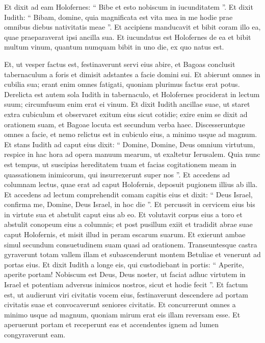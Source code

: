 \begin{biblechapter}
\begin{biblechapter}
\begin{biblechapter}
\begin{biblechapter}
\begin{biblechapter}
\begin{biblechapter}
\begin{biblechapter}
\begin{biblechapter}
\begin{biblechapter}
\begin{biblechapter}
\begin{biblechapter}
\begin{biblechapter}
\verse Et dixit ad eam Holofernes: “ Bibe et esto nobiscum in iucunditatem ”. 
\verse Et dixit Iudith: “ Bibam, domine, quia magnificata est vita mea in me hodie prae omnibus diebus nativitatis meae ”. 
\verse Et accipiens manducavit et bibit coram illo ea, quae praeparaverat ipsi ancilla sua. 
\verse Et iucundatus est Holofernes de ea et bibit multum vinum, quantum numquam bibit in uno die, ex quo natus est.
 
\begin{biblechapter}
\verse Et, ut vesper factus est, festinaverunt servi eius abire, et Bagoas conclusit tabernaculum a foris et dimisit adstantes a facie domini sui. Et abierunt omnes in cubilia sua; erant enim omnes fatigati, quoniam plurimus factus erat potus. 
\verse Derelicta est autem sola Iudith in tabernaculo, et Holofernes prociderat in lectum suum; circumfusum enim erat ei vinum. 
\verse Et dixit Iudith ancillae suae, ut staret extra cubiculum et observaret exitum eius sicut cotidie; exire enim se dixit ad orationem suam, et Bagoae locuta est secundum verba haec.
 \verse Discesseruntque omnes a facie, et nemo relictus est in cubiculo eius, a minimo usque ad magnum. Et stans Iudith ad caput eius dixit: “ Domine, Domine, Deus omnium virtutum, respice in hac hora ad opera manuum mearum, ut exaltetur Ierusalem. 
\verse Quia nunc est tempus, ut suscipias hereditatem tuam et facias cogitationem meam in quassationem inimicorum, qui insurrexerunt super nos ”. 
 \verse Et accedens ad columnam lectus, quae erat ad caput Holofernis, deposuit pugionem illius ab illa. 
\verse Et accedens ad lectum comprehendit comam capitis eius et dixit: “ Deus Israel, confirma me, Domine, Deus Israel, in hoc die ”. 
 \verse Et percussit in cervicem eius bis in virtute sua et abstulit caput eius ab eo. 
 \verse Et volutavit corpus eius a toro et abstulit conopeum eius a columnis; et post pusillum exiit et tradidit abrae suae caput Holofernis, 
\verse et misit illud in peram escarum suarum. Et exierunt ambae simul secundum consuetudinem suam quasi ad orationem. Transeuntesque castra gyraverunt totam vallem illam et subascenderunt montem Betuliae et venerunt ad portas eius.
 \verse Et dixit Iudith a longe eis, qui custodiebant in portis: “ Aperite, aperite portam! Nobiscum est Deus, Deus noster, ut faciat adhuc virtutem in Israel et potentiam adversus inimicos nostros, sicut et hodie fecit ”. 
\verse Et factum est, ut audierunt viri civitatis vocem eius, festinaverunt descendere ad portam civitatis suae et convocaverunt seniores civitatis. 
\verse Et concurrerunt omnes a minimo usque ad magnum, quoniam mirum erat eis illam reversam esse. Et aperuerunt portam et receperunt eas et accendentes ignem ad lumen congyraverunt eam. 

\end{biblechapter}
\end{biblechapter}
\end{biblechapter}
\end{biblechapter}
\end{biblechapter}
\end{biblechapter}
\end{biblechapter}
\end{biblechapter}
\end{biblechapter}
\end{biblechapter}
\end{biblechapter}
\end{biblechapter}
\end{biblechapter}
